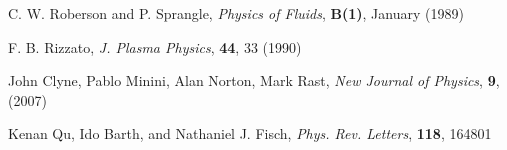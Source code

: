 \documentclass[aps,pra,preprint,showpacs,preprintnumbers,amsmath,amssymb]{revtex4-1}
\begin{document}
\begin{thebibliography}{99}
%


 

C. W. Roberson and P. Sprangle, {\sl Physics of Fluids}, {\bf B(1)},  January (1989)




F. B. Rizzato, {\sl J. Plasma Physics}, {\bf 44}, 33 (1990)

John Clyne, Pablo Minini, Alan Norton, Mark Rast, {\sl New Journal of Physics}, {\bf 9}, (2007)


Kenan Qu, Ido Barth, and Nathaniel J. Fisch, {\sl Phys. Rev. Letters}, {\bf 118}, {164801}

\end{thebibliography}
\end{document}
